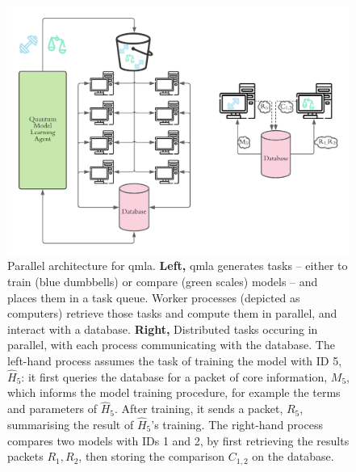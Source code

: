 \begin{figure}
    \includegraphics{algorithms/figures/parallel_architecture.pdf}
    \caption[Parallel architecture for QMLA]{
        Parallel architecture for \acrfull{qmla}.
        \textbf{Left,} \gls{qmla} generates tasks 
            -- either to train (blue dumbbells) or compare (green scales) models -- 
            and places them in a task queue. 
        Worker processes (depicted as computers) retrieve those tasks and compute them in parallel, 
            and interact with a database. 
        \textbf{Right,} Distributed tasks occuring in parallel, with each process communicating with the database. 
        The left-hand process assumes the task of training the model with ID 5, $\hat{H}_5$:
            it first queries the database for a packet of core information, $M_5$, 
            which informs the model training procedure, for example the terms and parameters 
            of $\hat{H}_5$. 
        After training, it sends a packet, $R_5$, summarising the result of $\hat{H}_5$'s training. 
        The right-hand process compares two models with IDs 1 and 2, by first retrieving the results packets
            $R_1, R_2$, then storing the comparison $C_{1,2}$ on the database. 
    }
    \label{fig:parallel}
\end{figure}

